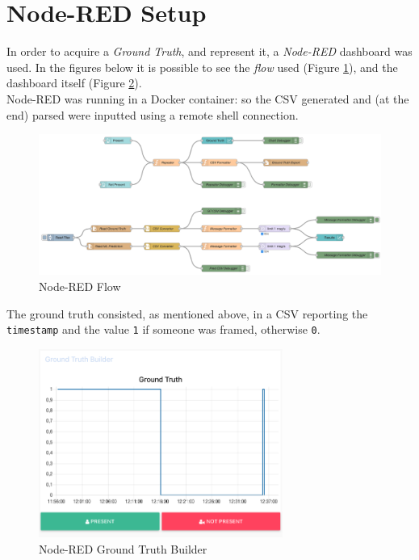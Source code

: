 \documentclass{article}
\begin{document}

\section{Node-RED Setup}

In order to acquire a \textit{Ground Truth}, and represent it, a \textit{Node-RED} dashboard was used. In the figures below it is possible to see the \textit{flow} used (Figure \ref{fig::node-red-flow}), and the dashboard itself (Figure \ref{fig::node-red-dashboard}). \\ Node-RED was running in a Docker container: so the CSV generated and (at the end) parsed were inputted using a remote shell connection.

\begin{figure}[h!]
	\centering
	\includegraphics[width=12cm]{assets/node-red-flow.png}
	\caption{Node-RED Flow}
	\label{fig::node-red-flow}
\end{figure}
The ground truth consisted, as mentioned above, in a CSV reporting the \texttt{timestamp} and the value \texttt{1} if someone was framed, otherwise \texttt{0}.

\begin{figure}[h!]
	\centering
	\includegraphics[width=8cm]{assets/ground-truth-builder.png}
	\caption{Node-RED Ground Truth Builder}
	\label{fig::node-red-dashboard}
\end{figure}
\end{document}
